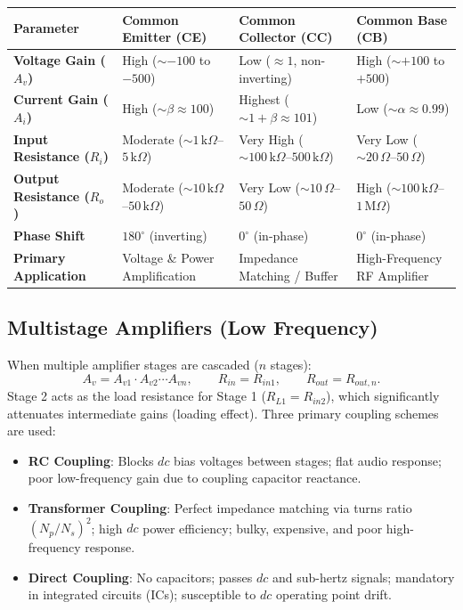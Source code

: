 \documentclass[12pt,a4paper]{article}
\begin{document}
\par\vspace{6pt}\noindent
\begin{tabularx}{\linewidth}{|B{3.2cm}|Y|Y|Y|}
\hline
\textbf{Parameter} & \textbf{Common Emitter (CE)} & \textbf{Common Collector (CC)} & \textbf{Common Base (CB)} \\
\hline
\textbf{Voltage Gain ($A_v$)} & High ($\sim -100$ to $-500$) & Low ($\approx 1$, non-inverting) & High ($\sim +100$ to $+500$) \\
\hline
\textbf{Current Gain ($A_i$)} & High ($\sim \beta \approx 100$) & Highest ($\sim 1+\beta \approx 101$)& Low ($\sim \alpha \approx 0.99$) \\
\hline
\textbf{Input Resistance ($R_i$)}& Moderate ($\sim 1\,\mathrm{k}\Omega$--$5\,\mathrm{k}\Omega$) & Very High ($\sim 100\,\mathrm{k}\Omega$--$500\,\mathrm{k}\Omega$) & Very Low ($\sim 20\,\Omega$--$50\,\Omega$) \\
\hline
\textbf{Output Resistance ($R_o$)}& Moderate ($\sim 10\,\mathrm{k}\Omega$--$50\,\mathrm{k}\Omega$)& Very Low ($\sim 10\,\Omega$--$50\,\Omega$) & High ($\sim 100\,\mathrm{k}\Omega$--$1\,\mathrm{M}\Omega$) \\
\hline
\textbf{Phase Shift} & $180^\circ$ (inverting) & $0^\circ$ (in-phase) & $0^\circ$ (in-phase) \\
\hline
\textbf{Primary Application}& Voltage \& Power Amplification & Impedance Matching / Buffer & High-Frequency RF Amplifier \\
\hline
\end{tabularx}
\par\vspace{12pt}

\subsection{Multistage Amplifiers (Low Frequency)}
When multiple amplifier stages are cascaded ($n$ stages):
\[
A_v = A_{v1} \cdot A_{v2} \cdots A_{vn},\qquad
R_{in} = R_{in1},\qquad
R_{out} = R_{out,n}.
\]
Stage 2 acts as the load resistance for Stage 1 ($R_{L1} = R_{in2}$), which significantly attenuates intermediate gains (loading effect). Three primary coupling schemes are used:
\begin{itemize}[leftmargin=1.5em, itemsep=2pt]
  \item \textbf{RC Coupling}: Blocks $dc$ bias voltages between stages; flat audio response; poor low-frequency gain due to coupling capacitor reactance.
  \item \textbf{Transformer Coupling}: Perfect impedance matching via turns ratio $(N_p/N_s)^2$; high $dc$ power efficiency; bulky, expensive, and poor high-frequency response.
  \item \textbf{Direct Coupling}: No capacitors; passes $dc$ and sub-hertz signals; mandatory in integrated circuits (ICs); susceptible to $dc$ operating point drift.
\end{itemize}
\end{document}
